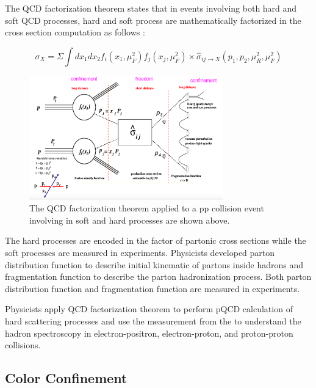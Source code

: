 The QCD factorization theorem states that in events involving both hard and soft QCD processes, hard and soft process are mathematically factorized in the cross section computation as follows \cite{QCDFactorization}: 

\begin{equation}
\sigma_X = \Sigma \int dx_1 dx_2 f_i(x_1,\mu_F^2) f_j(x_j,\mu_F^2) \times \hat \sigma_{ij\rightarrow X} (p_1,p_2,\mu_R^2,\mu_F^2)  
\end{equation}

\begin{figure}[hbtp]
\begin{center}
\includegraphics[width=0.75\textwidth]{Figures/Chapter1/QCDFactorizationTheorem.png}
\caption{The QCD factorization theorem applied to a pp collision event involving in soft and hard processes are shown above.}
\label{QCDFacTheo}
\end{center}
\end{figure} 

The hard processes are encoded in the factor of partonic cross sections while the soft processes are measured in experiments. Physicists developed parton distribution function to describe initial kinematic of partons inside hadrons and fragmentation function to describe the parton hadronization process. Both parton distribution function and fragmentation function are measured in experiments.


Physicists apply QCD factorization theorem to perform pQCD calculation of hard scattering processes and use the measurement from the  to understand the hadron spectroscopy in electron-positron, electron-proton, and proton-proton collisions.

\subsection{Color Confinement}

